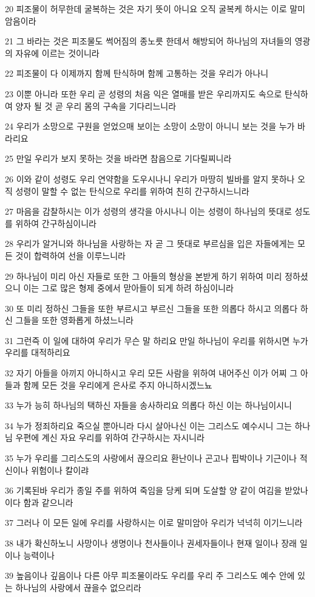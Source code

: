 \par 20 피조물이 허무한데 굴복하는 것은 자기 뜻이 아니요 오직 굴복케 하시는 이로 말미암음이라
\par 21 그 바라는 것은 피조물도 썩어짐의 종노릇 한데서 해방되어 하나님의 자녀들의 영광의 자유에 이르는 것이니라
\par 22 피조물이 다 이제까지 함께 탄식하며 함께 고통하는 것을 우리가 아나니
\par 23 이뿐 아니라 또한 우리 곧 성령의 처음 익은 열매를 받은 우리까지도 속으로 탄식하여 양자 될 것 곧 우리 몸의 구속을 기다리느니라
\par 24 우리가 소망으로 구원을 얻었으매 보이는 소망이 소망이 아니니 보는 것을 누가 바라리요
\par 25 만일 우리가 보지 못하는 것을 바라면 참음으로 기다릴찌니라
\par 26 이와 같이 성령도 우리 연약함을 도우시나니 우리가 마땅히 빌바를 알지 못하나 오직 성령이 말할 수 없는 탄식으로 우리를 위하여 친히 간구하시느니라
\par 27 마음을 감찰하시는 이가 성령의 생각을 아시나니 이는 성령이 하나님의 뜻대로 성도를 위하여 간구하심이니라
\par 28 우리가 알거니와 하나님을 사랑하는 자 곧 그 뜻대로 부르심을 입은 자들에게는 모든 것이 합력하여 선을 이루느니라
\par 29 하나님이 미리 아신 자들로 또한 그 아들의 형상을 본받게 하기 위하여 미리 정하셨으니 이는 그로 많은 형제 중에서 맏아들이 되게 하려 하심이니라
\par 30 또 미리 정하신 그들을 또한 부르시고 부르신 그들을 또한 의롭다 하시고 의롭다 하신 그들을 또한 영화롭게 하셨느니라
\par 31 그런즉 이 일에 대하여 우리가 무슨 말 하리요 만일 하나님이 우리를 위하시면 누가 우리를 대적하리요
\par 32 자기 아들을 아끼지 아니하시고 우리 모든 사람을 위하여 내어주신 이가 어찌 그 아들과 함께 모든 것을 우리에게 은사로 주지 아니하시겠느뇨
\par 33 누가 능히 하나님의 택하신 자들을 송사하리요 의롭다 하신 이는 하나님이시니
\par 34 누가 정죄하리요 죽으실 뿐아니라 다시 살아나신 이는 그리스도 예수시니 그는 하나님 우편에 계신 자요 우리를 위하여 간구하시는 자시니라
\par 35 누가 우리를 그리스도의 사랑에서 끊으리요 환난이나 곤고나 핍박이나 기근이나 적신이나 위험이나 칼이랴
\par 36 기록된바 우리가 종일 주를 위하여 죽임을 당케 되며 도살할 양 같이 여김을 받았나이다 함과 같으니라
\par 37 그러나 이 모든 일에 우리를 사랑하시는 이로 말미암아 우리가 넉넉히 이기느니라
\par 38 내가 확신하노니 사망이나 생명이나 천사들이나 권세자들이나 현재 일이나 장래 일이나 능력이나
\par 39 높음이나 깊음이나 다른 아무 피조물이라도 우리를 우리 주 그리스도 예수 안에 있는 하나님의 사랑에서 끊을수 없으리라


